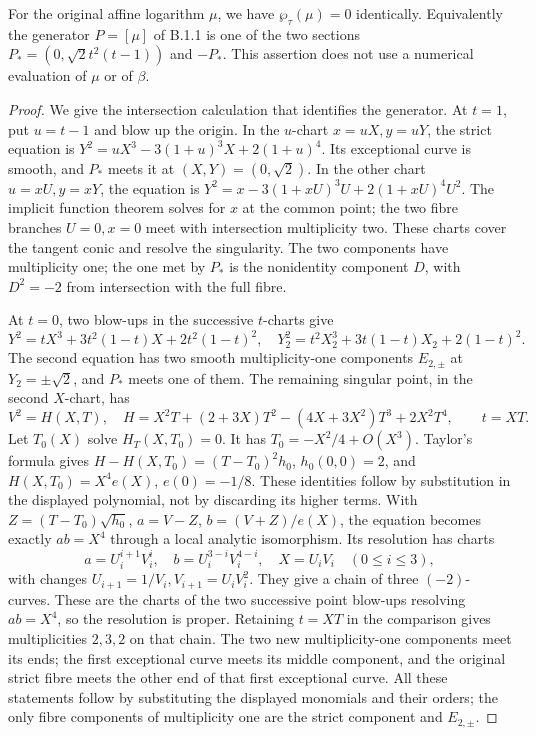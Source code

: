 \begin{proposition}\label{fam:src:B.1.3}\label{fam:st:B.1.3}
For the original affine logarithm $\mu$, we have $\wp_\tau(\mu)=0$ identically. Equivalently the generator $P=[\mu]$ of B.1.1 is one of the two sections $P_*=(0,\sqrt2t^2(t-1))$ and $-P_*$. This assertion does not use a numerical evaluation of $\mu$ or of $\beta$.
\end{proposition}
\begin{proof}
We give the intersection calculation that identifies the generator. At $t=1$, put $u=t-1$ and blow up the origin. In the $u$-chart $x=uX,y=uY$, the strict equation is
$Y^2=uX^3-3(1+u)^3X+2(1+u)^4$. Its exceptional curve is smooth, and $P_*$ meets it at $(X,Y)=(0,\sqrt2)$. In the other chart $u=xU,y=xY$, the equation is $Y^2=x-3(1+xU)^3U+2(1+xU)^4U^2$. The implicit function theorem solves for $x$ at the common point; the two fibre branches $U=0,x=0$ meet with intersection multiplicity two. These charts cover the tangent conic and resolve the singularity. The two components have multiplicity one; the one met by $P_*$ is the nonidentity component $D$, with $D^2=-2$ from intersection with the full fibre.

At $t=0$, two blow-ups in the successive $t$-charts give
\[
 Y^2=tX^3+3t^2(1-t)X+2t^2(1-t)^2,
\quad
 Y_2^2=t^2X_2^3+3t(1-t)X_2+2(1-t)^2.
\]
The second equation has two smooth multiplicity-one components $E_{2,\pm}$ at $Y_2=\pm\sqrt2$, and $P_*$ meets one of them. The remaining singular point, in the second $X$-chart, has
\[
 V^2=H(X,T),\quad H=X^2T+(2+3X)T^2-(4X+3X^2)T^3+2X^2T^4,
 \qquad t=XT.
\]
Let $T_0(X)$ solve $H_T(X,T_0)=0$. It has $T_0=-X^2/4+O(X^3)$. Taylor's formula gives
$H-H(X,T_0)=(T-T_0)^2h_0$, $h_0(0,0)=2$, and $H(X,T_0)=X^4e(X)$, $e(0)=-1/8$. These identities follow by substitution in the displayed polynomial, not by discarding its higher terms. With $Z=(T-T_0)\sqrt{h_0}$, $a=V-Z$, $b=(V+Z)/e(X)$, the equation becomes exactly $ab=X^4$ through a local analytic isomorphism. Its resolution has charts
\[
 a=U_i^{i+1}V_i^i,\quad b=U_i^{3-i}V_i^{4-i},\quad X=U_iV_i
 \quad(0\le i\le3),
\]
with changes $U_{i+1}=1/V_i,V_{i+1}=U_iV_i^2$. They give a chain of three $(-2)$-curves. These are the charts of the two successive point blow-ups resolving $ab=X^4$, so the resolution is proper. Retaining $t=XT$ in the comparison gives multiplicities $2,3,2$ on that chain. The two new multiplicity-one components meet its ends; the first exceptional curve meets its middle component, and the original strict fibre meets the other end of that first exceptional curve. All these statements follow by substituting the displayed monomials and their orders; the only fibre components of multiplicity one are the strict component and $E_{2,\pm}$.


\end{proof}
